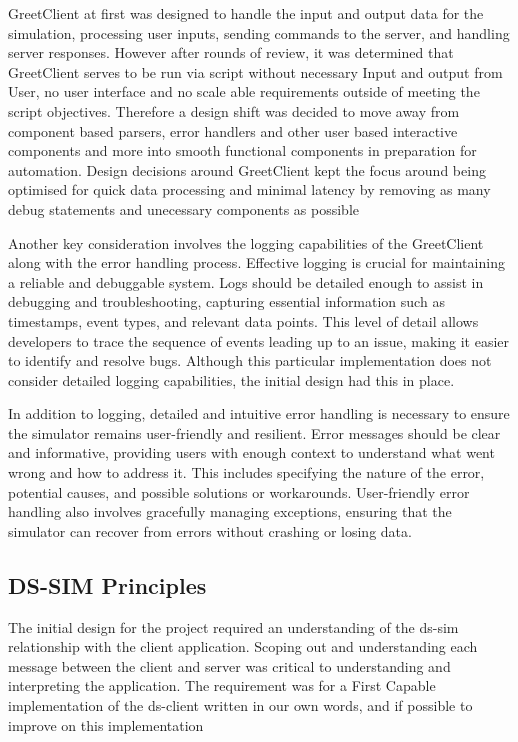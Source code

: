 GreetClient at first was designed to handle the input and output data for the simulation, processing user inputs, sending commands to the server, and handling server responses. However after rounds of review, it was determined that GreetClient serves to be run via script without necessary Input and output from User, no user interface and no scale able requirements outside of meeting the script objectives. Therefore a design shift was decided to move away from component based parsers, error handlers and other user based interactive components and more into smooth functional components in preparation for automation. Design decisions around GreetClient kept the focus around being optimised for quick data processing and minimal latency by removing as many debug statements and unecessary components as possible


Another key consideration involves the logging capabilities of the GreetClient along with the error handling process. Effective logging is crucial for maintaining a reliable and debuggable system. Logs should be detailed enough to assist in debugging and troubleshooting, capturing essential information such as timestamps, event types, and relevant data points. This level of detail allows developers to trace the sequence of events leading up to an issue, making it easier to identify and resolve bugs. Although this particular implementation does not consider detailed logging capabilities, the initial design had this in place.

In addition to logging, detailed and intuitive error handling is necessary to ensure the simulator remains user-friendly and resilient. Error messages should be clear and informative, providing users with enough context to understand what went wrong and how to address it. This includes specifying the nature of the error, potential causes, and possible solutions or workarounds. User-friendly error handling also involves gracefully managing exceptions, ensuring that the simulator can recover from errors without crashing or losing data.

\subsection{DS-SIM Principles} 
The initial design for the project required an understanding of the ds-sim relationship with the client application. Scoping out and understanding each message between the client and server was critical to understanding and interpreting the application. The requirement was for a First Capable implementation of the ds-client written in our own words, and if possible to improve on this implementation

